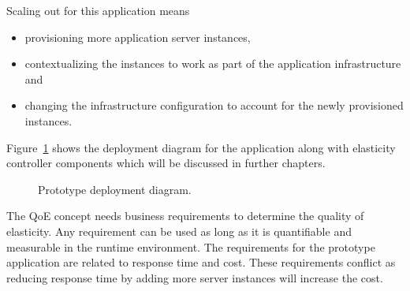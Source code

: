 \documentclass[english]{tktltiki2}
\theoremstyle{definition}
\theoremstyle{remark}
\begin{document}
Scaling out for this application means  

\begin{itemize}
	\item{provisioning more application server instances,}
	\item{contextualizing the instances to work as part of the application 
	infrastructure and}
	\item{changing the infrastructure configuration to account for the newly 
	provisioned instances.}
\end{itemize}

Figure~\ref{fig:deploymentDiagram} shows the deployment diagram for the
application along with elasticity controller components which will be discussed
in further chapters.

\begin{figure}[h]
	\centerline{
	}
	\caption{Prototype deployment diagram.}
	\label{fig:deploymentDiagram}
\end{figure}


The QoE concept needs business requirements to determine the quality of
elasticity. Any requirement can be used as long as it is quantifiable and
measurable in the runtime environment. The requirements for the prototype
application are related to response time and cost. These requirements conflict
as reducing response time by adding more server instances will increase the
cost.
\end{document}
